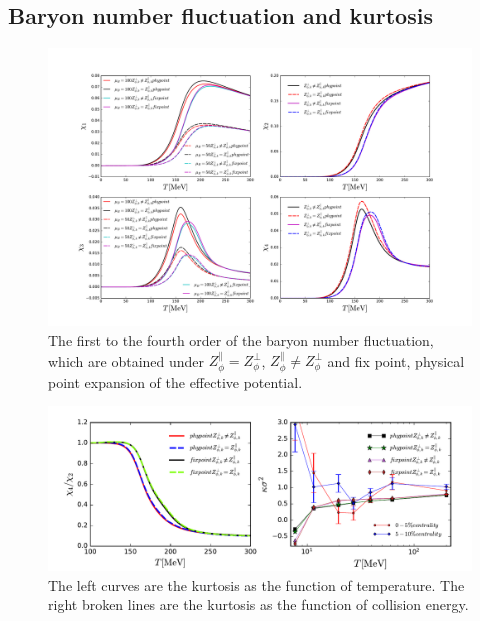 \documentclass[%
reprint,
superscriptaddress,
showpacs,preprintnumbers,
 amsmath,amssymb,
 aps,
prd,
]{revtex4-1}
\begin{document}
\subsection{Baryon number fluctuation and kurtosis}
\begin{figure}[t]
\label{fig:4chi}
\includegraphics[width=1.0\textwidth]{4chi.pdf}
\caption{The first to the fourth order of the baryon number fluctuation, which are obtained under $Z^{\|}_{\phi}=Z^{\bot}_{\phi}$, $Z^{\|}_{\phi}\neq Z^{\bot}_{\phi}$ 
and fix point, physical point expansion of the effective potential. }
\end{figure}

\begin{figure}[t]
\includegraphics[width=1.0\textwidth]{kur.pdf}
\caption{The left curves are the kurtosis as the function of temperature. The right broken lines are the kurtosis as the function of collision energy.}
\label{fig:r42}
\end{figure}
\end{document}

